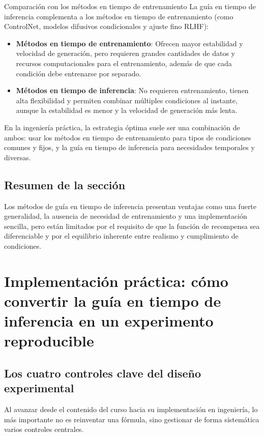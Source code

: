 \documentclass[a4paper]{article}
\begin{document}
\begin{knowledgebox}{Comparación con los métodos en tiempo de entrenamiento}
La guía en tiempo de inferencia complementa a los métodos en tiempo de entrenamiento (como ControlNet, modelos difusivos condicionales y ajuste fino RLHF):
\begin{itemize}
    \item \textbf{Métodos en tiempo de entrenamiento}: Ofrecen mayor estabilidad y velocidad de generación, pero requieren grandes cantidades de datos y recursos computacionales para el entrenamiento, además de que cada condición debe entrenarse por separado.
    \item \textbf{Métodos en tiempo de inferencia}: No requieren entrenamiento, tienen alta flexibilidad y permiten combinar múltiples condiciones al instante, aunque la estabilidad es menor y la velocidad de generación más lenta.
\end{itemize}
En la ingeniería práctica, la estrategia óptima suele ser una combinación de ambos: usar los métodos en tiempo de entrenamiento para tipos de condiciones comunes y fijos, y la guía en tiempo de inferencia para necesidades temporales y diversas.
\end{knowledgebox}

\subsection{Resumen de la sección}

Los métodos de guía en tiempo de inferencia presentan ventajas como una fuerte generalidad, la ausencia de necesidad de entrenamiento y una implementación sencilla, pero están limitados por el requisito de que la función de recompensa sea diferenciable y por el equilibrio inherente entre realismo y cumplimiento de condiciones.

\section{Implementación práctica: cómo convertir la guía en tiempo de inferencia en un experimento reproducible}

\subsection{Los cuatro controles clave del diseño experimental}

Al avanzar desde el contenido del curso hacia su implementación en ingeniería, lo más importante no es reinventar una fórmula, sino gestionar de forma sistemática varios controles centrales.
\end{document}
